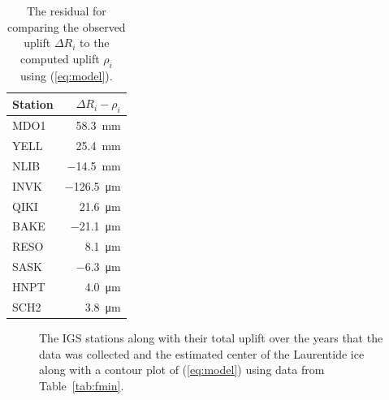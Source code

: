 \documentclass[12pt,a4paper]{article}
\begin{document}
\begin{table}[!ht]
  \centering
  \caption{The residual for comparing the observed uplift $\Delta R_i$ to the computed uplift $\rho_i$ using (\ref{eq:model}).}
  \begin{tabular}{|l|r|} \hline
    Station & $\Delta R_i - \rho_i$ \\ \hline
    MDO1 & \SI{58.3}{\milli\meter} \\
    YELL & \SI{25.4}{\milli\meter} \\
    NLIB & \SI{-14.5}{\milli\meter} \\
    INVK & \SI{-126.5}{\micro\meter} \\
    QIKI & \SI{21.6}{\micro\meter} \\
    BAKE & \SI{-21.1}{\micro\meter} \\
    RESO & \SI{8.1}{\micro\meter} \\
    SASK & \SI{-6.3}{\micro\meter} \\
    HNPT & \SI{4.0}{\micro\meter} \\
    SCH2 & \SI{3.8}{\micro\meter} \\\hline
  \end{tabular}
  \label{tab:residual}
\end{table}

\begin{figure}[!ht]
  \centering
  \noindent{}
  \caption{The IGS stations along with their total uplift over the years that the data was collected and the estimated center of the Laurentide ice along with a contour plot of (\ref{eq:model}) using data from Table~\ref{tab:fmin}.}
  \label{fig:laurentide_result}
\end{figure}
\end{document}
